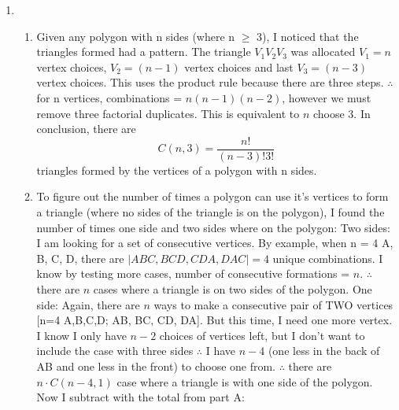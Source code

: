 \documentclass[11pt]{article}
\begin{document}
	
	\begin{enumerate}
		
		\item {
			      \begin{enumerate}
			      	\item{
			      	      Given any polygon with n sides (where n $\geq$ 3), I noticed that the triangles formed had a pattern. The triangle $V_1V_2V_3$ was allocated $V_1=n$ vertex choices, $V_2=(n-1)$ vertex choices and last $V_3=(n-3)$ vertex choices. This uses the product rule because there are three steps. $\therefore$ for n vertices, combinations = $n(n-1)(n-2)$, however we must remove three factorial duplicates. This is equivalent to $n$ choose 3. In conclusion, there are
			      	      \[C(n,3) = \frac{n!}{(n-3)!3!}\]
			      	      triangles formed by the vertices of a polygon with n sides.
			      	}
			      	\item {
			      		      To figure out the number of times a polygon can use it's vertices to form a triangle (where no sides of the triangle is on the polygon), I found the number of times one side and two sides where on the polygon:\newline
			      		      \newline
			      		      Two sides: I am looking for a set of consecutive vertices. By example, when n = 4 {A, B, C, D}, there are $|{ABC, BCD, CDA, DAC}| = 4$ unique combinations. I know by testing more cases, number of consecutive formations = $n$.
			      		      $\therefore$ there are $n$ cases where a triangle is on two sides of the polygon.\newline
			      		      \newline
			      		      One side: Again, there are $n$ ways to make a consecutive pair of TWO vertices [n=4 {A,B,C,D}; {AB, BC, CD, DA}]. But this time, I need one more vertex. I know I only have $n-2$ choices of vertices left, but I don't want to include the case with three sides $\therefore$ I have $n-4$ (one less in the back of AB and one less in the front) to choose one from. $\therefore$ there are $n \cdot C(n-4, 1)$ case where a triangle is with one side of the polygon.\newline
			      		      \newline
			      		      Now I subtract with the total from part A:\newline
}
\end{enumerate}}
\end{enumerate}
\end{document}
